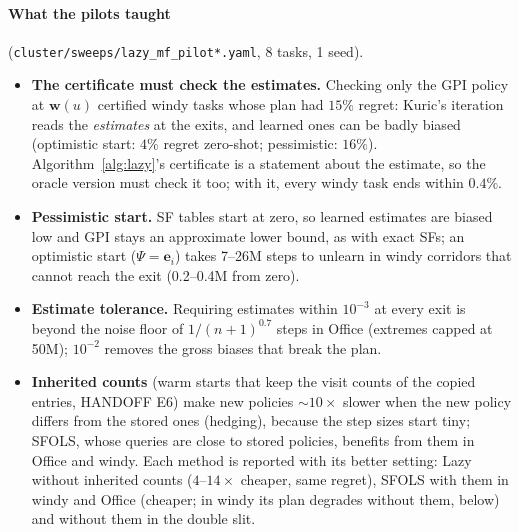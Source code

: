 \documentclass[11pt]{article}
\newcommand{\w}{\mathbf{w}}
\begin{document}
\paragraph{What the pilots taught} (\texttt{cluster/sweeps/lazy\_mf\_pilot*.yaml}, 8 tasks, 1 seed).
\begin{itemize}\setlength\itemsep{1pt}
\item \textbf{The certificate must check the estimates.} Checking only the GPI policy at $\w(u)$ certified windy tasks
whose plan had $15\%$ regret: Kuric's iteration reads the \emph{estimates} at the exits, and learned ones can be badly
biased (optimistic start: $4\%$ regret zero-shot; pessimistic: $16\%$). Algorithm~\ref{alg:lazy}'s certificate is a
statement about the estimate, so the oracle version must check it too; with it, every windy task ends within $0.4\%$.
\item \textbf{Pessimistic start.} SF tables start at zero, so learned estimates are biased low and GPI stays an
approximate lower bound, as with exact SFs; an optimistic start ($\Psi=\mathbf e_i$) takes 7--26M steps to unlearn in
windy corridors that cannot reach the exit (0.2--0.4M from zero).
\item \textbf{Estimate tolerance.} Requiring estimates within $10^{-3}$ at every exit is beyond the noise floor of
$1/(n+1)^{0.7}$ steps in Office (extremes capped at 50M); $10^{-2}$ removes the gross biases that break the plan.
\item \textbf{Inherited counts} (warm starts that keep the visit counts of the copied entries, HANDOFF E6) make new
policies $\sim10\times$ slower when the new policy differs from the stored ones (hedging), because the step sizes start
tiny; SFOLS, whose queries are close to stored policies, benefits from them in Office and windy. Each method is
reported with its better setting: Lazy without inherited counts ($4$--$14\times$ cheaper, same regret), SFOLS with
them in windy and Office (cheaper; in windy its plan degrades without them, below) and without them in the double slit.
\end{itemize}
\end{document}
